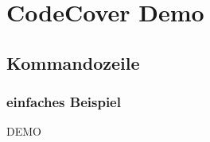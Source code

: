 \documentclass{beamer}
\begin{document}
  \section{CodeCover Demo}
  \subsection{Kommandozeile}
  \begin{frame}\frametitle{einfaches Beispiel}
    \centering \Huge{DEMO}\\
  \end{frame}

%  
%  
%  
%  
\end{document}
